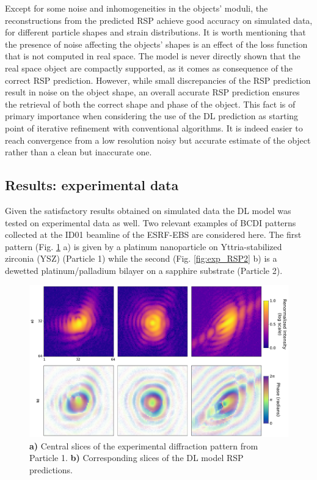 Except for some noise and inhomogeneities in the objects' moduli, the reconstructions from the predicted RSP achieve 
good accuracy on simulated data, for different particle shapes and strain distributions. It is worth mentioning that 
the presence of noise affecting the objects' shapes is an effect of the loss function that is not computed in real space. 
The model is never directly shown that the real space object are compactly supported, as it comes as consequence of the  
correct RSP prediction. However, while small discrepancies of the RSP prediction result in noise on the object shape, 
an overall accurate RSP prediction ensures the retrieval of both the correct shape and phase of the object. This fact is 
of primary importance when considering the use of the DL prediction as starting point of iterative refinement with 
conventional algorithms. It is indeed easier to reach convergence from a low resolution noisy but accurate estimate of 
the object rather than a clean but inaccurate one.  

\subsection{Results: experimental data}\label{chp:phasing_results}
Given the satisfactory results obtained on simulated data the DL model was tested on experimental data as well. 
Two relevant examples of BCDI patterns collected at the ID01 beamline of the ESRF-EBS are considered here. 
The first pattern (Fig. \ref{fig:exp_RSP1} a) is given by a platinum nanoparticle on Yttria-stabilized zirconia (YSZ) 
(Particle 1) while the second (Fig. \ref{fig:exp_RSP2} b) is a dewetted platinum/palladium bilayer on a sapphire substrate
(Particle 2). 

\begin{figure}[H]
    \centering
    \includegraphics[width=\textwidth]{figures/Phasing/exp_data1.pdf}
    \caption{\textbf{a)} Central slices of the experimental diffraction pattern from Particle 1. \textbf{b)} Corresponding 
    slices of the DL model RSP predictions.}
    \label{fig:exp_RSP1}
\end{figure}

